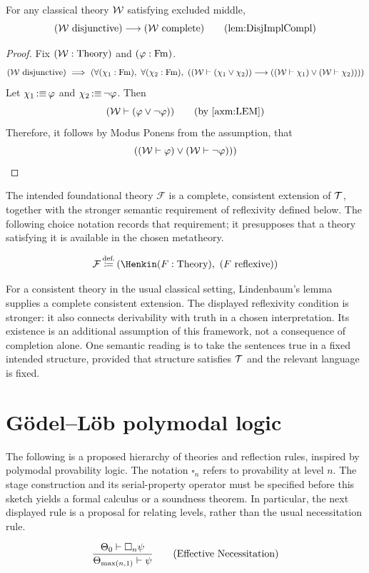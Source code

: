 \begin{lemma}
For any classical theory ${\mathcal{W}}$ satisfying excluded middle,
\[
(\Wau\text{ disjunctive})
\implies
(\Wau\text{ complete})
\labeltagd{lem}{DisjImplCompl}
\]
\end{lemma}
\begin{proof}
Fix $({\mathcal{W}}:{\text{Theory}})$ and $(\varphi:\mathrm{Fm})$.
\[
(\Wau\text{ disjunctive})
\IMPLIES
(
\forall (\chi_1:\Fm),\ %
\forall (\chi_2:\Fm),\ %
((\Wau \vdash (\chi_1\lor\chi_2))
\implies
(
(\Wau \vdash \chi_1)
\lor 
(\Wau \vdash \chi_2)
))
)
\]
Let $\chi_1 \,{:\equiv}\, \varphi$ and $\chi_2 \,{:\equiv}\, \neg\varphi$. Then
\[
(\Wau \vdash (\phi\lor\neg\phi))
\tag{by \ref{axm:LEM}}
\]
Therefore, it follows by Modus Ponens from the assumption, that
\[
(
({\mathcal{W}} \vdash \varphi)
\lor 
({\mathcal{W}} \vdash \neg\varphi)
))
\]
\end{proof}
\begin{definition*}%
The intended foundational theory $\mathcal{F}$ is a complete, consistent
extension of $\mathcal{T}$, together with the stronger semantic requirement of
reflexivity defined below. The following choice notation records that
requirement; it presupposes that a theory satisfying it is available in the
chosen metatheory.

\[
\Fau
\eqdef
(\Henkin (F:\Theory),\ (F\text{ reflexive}))
\]

For a consistent theory in the usual classical setting, Lindenbaum's lemma
supplies a complete consistent extension. The displayed reflexivity condition
is stronger: it also connects derivability with truth in a chosen
interpretation. Its existence is an additional assumption of this framework,
not a consequence of completion alone. One semantic reading is to take the
sentences true in a fixed intended structure, provided that structure
satisfies $\mathcal{T}$ and the relevant language is fixed.
\end{definition*}

\section{G\"odel--L\"ob polymodal logic}
The following is a proposed hierarchy of theories and reflection rules,
inspired by polymodal provability logic. The notation $\square_n$ refers to
provability at level $n$. The stage construction and its serial-property
operator must be specified before this sketch yields a formal calculus or a
soundness theorem. In particular, the next displayed rule is a proposal for
relating levels, rather than the usual necessitation rule.
\begin{inferencerule}
\[
\frac{
\Theta_0 \vdash \square_n \psi
}{
\Theta_{\max(n,1)} \vdash \psi
}
\labeltag{Effective Necessitation}
\]
\end{inferencerule}

